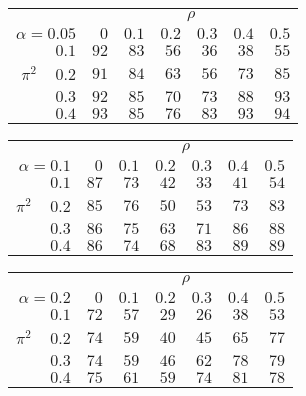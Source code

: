 \begin{tabular}{r|rrrrrr}
\hline\hline
 &\multicolumn{6}{c}{$\rho$} \\ 
 $\alpha = 0.05$ & $0$ & $0.1$ & $0.2$ & $0.3$ & $0.4$ & $0.5$ \\ 
 \hline$0.1$ & $92$ & $83$ & $56$ & $36$ & $38$ & $55$\\ 
$\pi^2\;\;\;$ $0.2$ & $91$ & $84$ & $63$ & $56$ & $73$ & $85$\\ 
$0.3$ & $92$ & $85$ & $70$ & $73$ & $88$ & $93$\\ 
$0.4$ & $93$ & $85$ & $76$ & $83$ & $93$ & $94$\\ 
 \hline 
 \end{tabular}
 
 \vspace{2em} 
 
\begin{tabular}{r|rrrrrr}
\hline\hline
 &\multicolumn{6}{c}{$\rho$} \\ 
 $\alpha = 0.1$ & $0$ & $0.1$ & $0.2$ & $0.3$ & $0.4$ & $0.5$ \\ 
 \hline$0.1$ & $87$ & $73$ & $42$ & $33$ & $41$ & $54$\\ 
$\pi^2\;\;\;$ $0.2$ & $85$ & $76$ & $50$ & $53$ & $73$ & $83$\\ 
$0.3$ & $86$ & $75$ & $63$ & $71$ & $86$ & $88$\\ 
$0.4$ & $86$ & $74$ & $68$ & $83$ & $89$ & $89$\\ 
 \hline 
 \end{tabular}
 
 \vspace{2em} 
 
\begin{tabular}{r|rrrrrr}
\hline\hline
 &\multicolumn{6}{c}{$\rho$} \\ 
 $\alpha = 0.2$ & $0$ & $0.1$ & $0.2$ & $0.3$ & $0.4$ & $0.5$ \\ 
 \hline$0.1$ & $72$ & $57$ & $29$ & $26$ & $38$ & $53$\\ 
$\pi^2\;\;\;$ $0.2$ & $74$ & $59$ & $40$ & $45$ & $65$ & $77$\\ 
$0.3$ & $74$ & $59$ & $46$ & $62$ & $78$ & $79$\\ 
$0.4$ & $75$ & $61$ & $59$ & $74$ & $81$ & $78$\\ 
 \hline 
 \end{tabular}